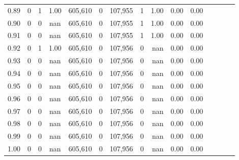 \begin{tabular}{rrrcrrrrrrrrrrr}
0.89 &       0 &      1 &                                       1.00 &  605,610 &        0 &  107,955 &        1 &  1.00 &  0.00 &                         0.00 \\
0.90 &       0 &      0 &                                        nan &  605,610 &        0 &  107,955 &        1 &  1.00 &  0.00 &                         0.00 \\
0.91 &       0 &      0 &                                        nan &  605,610 &        0 &  107,955 &        1 &  1.00 &  0.00 &                         0.00 \\
0.92 &       0 &      1 &                                       1.00 &  605,610 &        0 &  107,956 &        0 &   nan &  0.00 &                         0.00 \\
0.93 &       0 &      0 &                                        nan &  605,610 &        0 &  107,956 &        0 &   nan &  0.00 &                         0.00 \\
0.94 &       0 &      0 &                                        nan &  605,610 &        0 &  107,956 &        0 &   nan &  0.00 &                         0.00 \\
0.95 &       0 &      0 &                                        nan &  605,610 &        0 &  107,956 &        0 &   nan &  0.00 &                         0.00 \\
0.96 &       0 &      0 &                                        nan &  605,610 &        0 &  107,956 &        0 &   nan &  0.00 &                         0.00 \\
0.97 &       0 &      0 &                                        nan &  605,610 &        0 &  107,956 &        0 &   nan &  0.00 &                         0.00 \\
0.98 &       0 &      0 &                                        nan &  605,610 &        0 &  107,956 &        0 &   nan &  0.00 &                         0.00 \\
0.99 &       0 &      0 &                                        nan &  605,610 &        0 &  107,956 &        0 &   nan &  0.00 &                         0.00 \\
1.00 &       0 &      0 &                                        nan &  605,610 &        0 &  107,956 &        0 &   nan &  0.00 &                         0.00 \\
\bottomrule
\end{tabular}
